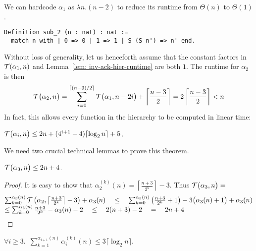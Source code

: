 We can hardcode $\alpha_1$ as $\lambda n.(n-2)$ to reduce its runtime
from $\Theta(n)$ to $\Theta(1)$.
\begin{lstlisting}
Definition sub_2 (n : nat) : nat :=
  match n with | 0 => 0 | 1 => 1 | S (S n') => n' end.
\end{lstlisting}
Without loss of generality, let us henceforth assume that the constant factors in $\mathcal{T}(\alpha_1, n)$ and Lemma~\ref{lem: inv-ack-hier-runtime} are both $1$. The runtime for $\alpha_2$ is then
\begin{equation*}
\mathcal{T}\big(\alpha_2, n\big)
 = \sum_{i=0}^{\lceil (n-3)/2 \rceil} \mathcal{T} \big(\alpha_1, n-2i\big) + \left\lceil \frac{n-3}{2} \right\rceil =  2\left\lceil \frac{n-3}{2} \right\rceil
 < n
\end{equation*}
In fact, this allows every function in the hierarchy to be computed in linear time:
\begin{thm} \label{thm: inv-ack-hier-runtime-improved}
	$\mathcal{T}\big(\alpha_i, n\big) \le 2n + (4^{i+1} - 4)\lceil \log_2n\rceil + 5$.
\end{thm}
We need two crucial technical lemmas to prove this theorem.
\begin{lem} \label{lem: inv-ack-3-runtime}
	$\mathcal{T}\big(\alpha_3, n\big) \le 2n + 4$.
\end{lem}
\begin{proof}
	It is easy to show that $\alpha_2^{(k)}(n) = \left\lceil \frac{n+3}{2^k} \right\rceil - 3$. Thus $\mathcal{T}\big(\alpha_3, n\big) = $
	\begin{equation*}
\begin{array}{@{}l@{}}
	\sum_{k=0}^{\alpha_{3}(n)}\runtime\left(\alpha_2, \left\lceil \frac{n+3}{2^k} \right\rceil - 3\right) + \alpha_{3}(n)  \quad
	\le \quad \sum_{k=0}^{\alpha_3(n)}\left(\frac{n+3}{2^k} + 1\right) - 3\big(\alpha_3(n) + 1\big) + \alpha_3(n) \\
	\le \sum_{k=0}^{\alpha_3(n)}\frac{n+3}{2^k} - \alpha_3(n) - 2 \quad \le \quad 2(n+3) - 2 \quad = \quad 2n + 4 \\
\end{array}
	\end{equation*}
\end{proof}
\begin{lem} \label{lem: sum-alpha-repeat}
	$\forall i \ge 3$.~$\displaystyle \sum_{k=1}^{\alpha_{i+1}(n)} \alpha_i^{(k)}(n) \le 3\big\lceil \log_2n \big\rceil$.
\end{lem}
